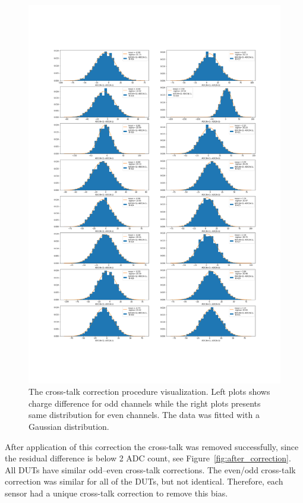 \begin{figure}
\centering
\includegraphics[width=\textwidth]{figures/eta/correction.png}
\caption{The cross-talk correction procedure visualization. Left plots shows charge difference for odd channels while the right plots presents same distribution for even channels. The data was fitted with a Gaussian distribution. } 
\label{fig:correction}
\end{figure}

After application of this correction the cross-talk was removed successfully, since the residual difference is below 2 ADC count, see Figure~\ref{fig:after_correction}. 
All DUTs have similar odd–even cross-talk corrections. The even/odd cross-talk correction was similar for all of the DUTs, but not identical. Therefore, each sensor had a unique cross-talk correction to remove this bias.

